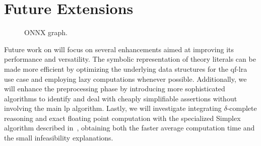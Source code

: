 \documentclass[runningheads]{llncs}
\begin{document}
\section{Future Extensions}



\begin{figure}
    \captionsetup{font=small}
    \resizebox{1.04\linewidth}{!}{%
        
    }
    \caption{ONNX graph.}
    \label{dg:onnx}
\end{figure}


Future work on \dlinear will focus on several enhancements aimed at improving its performance and versatility.
The symbolic representation of theory literals can be made more efficient by optimizing the underlying data structures for the \gls{qf-lra} use case and employing lazy computations whenever possible.
Additionally, we will enhance the preprocessing phase by introducing more sophisticated algorithms to identify and deal with cheaply simplifiable assertions without involving the main \gls{lp} algorithm.
Lastly, we will investigate integrating $\delta$-complete reasoning and exact floating point computation with the specialized Simplex algorithm described in~\cite{ref:lra-dpll-t}, obtaining both the faster average computation time and the small infeasibility explanations.
\end{document}
